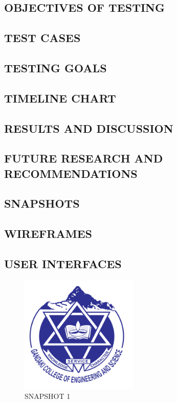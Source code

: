 \documentclass[a4paper, 14pt]{report}
\begin{document}
\begin{description}
	\section{OBJECTIVES OF TESTING}
	\section{TEST CASES}
	\section{TESTING GOALS}
	
	\begin{center}
		\chapter{TIMELINE CHART}
	\end{center}
	
	\begin{center}
		\chapter{RESULTS AND DISCUSSION}
	\end{center}
	\section{FUTURE RESEARCH AND RECOMMENDATIONS}

	\begin{center}
		\chapter{SNAPSHOTS}
	\end{center}
	\section{WIREFRAMES}
	\newpage
	\section{USER INTERFACES}
	
	
\begin{center}
	\begin{figure}[h!]
  \includegraphics[width=0.5\textwidth]{gces.png}
  \caption{SNAPSHOT 1}
\end{figure}


\end{center}
\end{description}
\end{document}
